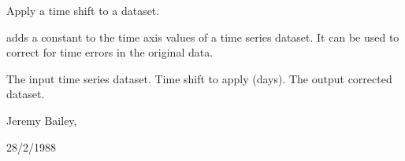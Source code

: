\begin{manroutinedescription}
        Apply a time shift to a dataset.

        {} adds a constant to the time axis values of a time
        series dataset. It can be used to correct for time errors
        in the original data.

\begin{manparametertable}
  The input %
time series dataset.
   Time shift to apply (days).
  The %
output corrected dataset.

\end{manparametertable}
         Jeremy Bailey, {}

         28/2/1988

\end{manroutinedescription}
